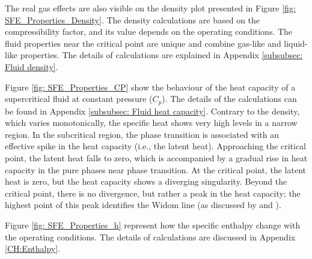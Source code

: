 \documentclass[../Article_Model_Parameters.tex]{subfiles}
\begin{document}
	The real gas effects are also visible on the density plot presented in Figure \ref{fig: SFE_Properties_Density}. The density calculations are based on the compressibility factor, and its value depends on the operating conditions. The fluid properties near the critical point are unique and combine gas-like and liquid-like properties. The details of calculations are explained in Appendix \ref{subsubsec: Fluid density}.
	
	Figure \ref{fig: SFE_Properties_CP} show the behaviour of the heat capacity of a supercritical fluid at constant pressure ($C_p$). The details of the calculations can be found in Appendix \ref{subsubsec: Fluid heat capacity}. Contrary to the density, which varies monotonically, the specific heat shows very high levels in a narrow region. In the subcritical region, the phase transition is associated with an effective spike in the heat capacity (i.e., the latent heat). Approaching the critical point, the latent heat falls to zero, which is accompanied by a gradual rise in heat capacity in the pure phases near phase transition. At the critical point, the latent heat is zero, but the heat capacity shows a diverging singularity. Beyond the critical point, there is no divergence, but rather a peak in the heat capacity; the highest point of this peak identifies the Widom line (as discussed by \citet{Simeoni2010} and \citet{Banuti2019}).
	
	Figure \ref{fig: SFE_Properties_h} represent how the specific enthalpy change with the operating conditions. The details of calculations are discussed in Appendix \ref{CH:Enthalpy}.
		
\end{document}

